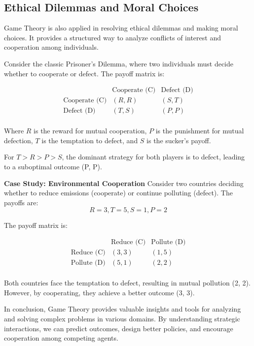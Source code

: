 \documentclass[12pt]{book} %
\begin{document}
\subsection{Ethical Dilemmas and Moral Choices}
Game Theory is also applied in resolving ethical dilemmas and making moral choices. It provides a structured way to analyze conflicts of interest and cooperation among individuals.

Consider the classic Prisoner's Dilemma, where two individuals must decide whether to cooperate or defect. The payoff matrix is:

\[
\begin{array}{c|c|c}
 & \text{Cooperate (C)} & \text{Defect (D)} \\
\hline
\text{Cooperate (C)} & (R, R) & (S, T) \\
\text{Defect (D)} & (T, S) & (P, P) \\
\end{array}
\]

Where \( R \) is the reward for mutual cooperation, \( P \) is the punishment for mutual defection, \( T \) is the temptation to defect, and \( S \) is the sucker's payoff.

For \( T > R > P > S \), the dominant strategy for both players is to defect, leading to a suboptimal outcome (P, P).

\textbf{Case Study: Environmental Cooperation}
Consider two countries deciding whether to reduce emissions (cooperate) or continue polluting (defect). The payoffs are:
\[
R = 3, T = 5, S = 1, P = 2
\]

The payoff matrix is:

\[
\begin{array}{c|c|c}
 & \text{Reduce (C)} & \text{Pollute (D)} \\
\hline
\text{Reduce (C)} & (3, 3) & (1, 5) \\
\text{Pollute (D)} & (5, 1) & (2, 2) \\
\end{array}
\]

Both countries face the temptation to defect, resulting in mutual pollution (2, 2). However, by cooperating, they achieve a better outcome (3, 3).

In conclusion, Game Theory provides valuable insights and tools for analyzing and solving complex problems in various domains. By understanding strategic interactions, we can predict outcomes, design better policies, and encourage cooperation among competing agents.
\end{document}
